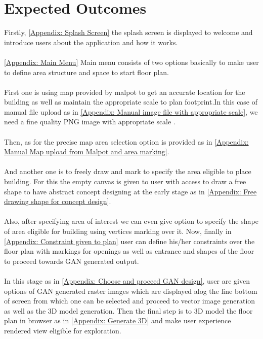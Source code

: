 \chapter{Expected Outcomes}
Firstly, \ref*{Appendix: Splash Screen} the splash screen is displayed to welcome and introduce users about the application and how it works.\\\\
\ref*{Appendix: Main Menu} Main menu consists of two options basically to make user to define area structure and space to start floor plan.\\\\
    First one is using map provided by malpot to get an accurate location for the building as well as maintain the appropriate scale to plan footprint.In this case of manual file upload as in \ref*{Appendix: Manual image file with appropriate scale}, we need a fine quality PNG image with appropriate scale .\\\\
    Then, as for the precise map area selection option is provided as in \ref*{Appendix: Manual Map upload from Malpot and area marking}.\\\\
    And another one is to freely draw and mark to specify the area eligible to place building.
    For this the empty canvas is given to user with access to draw a free shape to have abstract concept designing at the early stage as in \ref*{Appendix: Free drawing shape for concept design}.\\\\
    Also, after specifying area of interest we can even give option to specify the shape of area eligible for building using vertices marking over it.
    Now, finally in \ref*{Appendix: Constraint given to plan} user can define his/her constraints over the floor plan with markings for openings as well as entrance and shapes of the floor to proceed towards GAN generated output.\\\\
    In this stage as in \ref*{Appendix: Choose and proceed GAN design}, user are given options of GAN generated raster images which are displayed alog the line bottom of screen from which one can be selected and proceed to vector image generation as well as the 3D model generation.
    Then the final step is to 3D model the floor plan in browser as in \ref*{Appendix: Generate 3D} and make user experience rendered view eligible for exploration.\\\\

